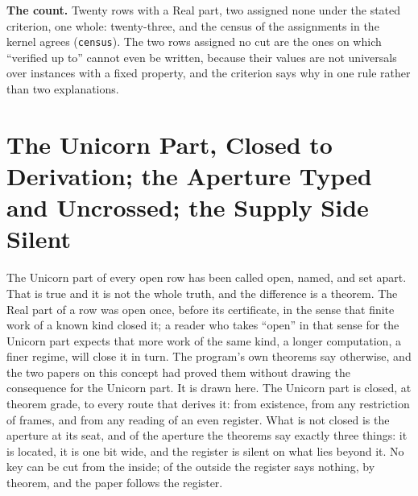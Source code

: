 \documentclass[10pt,twocolumn]{article}
\begin{document}
\textbf{The count.} Twenty rows with a Real part, two assigned none
under the stated criterion, one whole: twenty-three, and the census of
the assignments in the kernel agrees (\texttt{census}). The two rows
assigned no cut are the ones on which ``verified up to'' cannot even be
written, because their values are not universals over instances with a
fixed property, and the criterion says why in one rule rather than two
explanations.

\hypertarget{the-unicorn-part-closed-to-derivation-the-aperture-typed-and-uncrossed-the-supply-side-silent}{%
\section{The Unicorn Part, Closed to Derivation; the Aperture Typed and
Uncrossed; the Supply Side
Silent}\label{the-unicorn-part-closed-to-derivation-the-aperture-typed-and-uncrossed-the-supply-side-silent}}

The Unicorn part of every open row has been called open, named, and set
apart. That is true and it is not the whole truth, and the difference is
a theorem. The Real part of a row was open once, before its certificate,
in the sense that finite work of a known kind closed it; a reader who
takes ``open'' in that sense for the Unicorn part expects that more work
of the same kind, a longer computation, a finer regime, will close it in
turn. The program's own theorems say otherwise, and the two papers on
this concept had proved them without drawing the consequence for the
Unicorn part. It is drawn here. The Unicorn part is closed, at theorem
grade, to every route that derives it: from existence, from any
restriction of frames, and from any reading of an even register. What is
not closed is the aperture at its seat, and of the aperture the theorems
say exactly three things: it is located, it is one bit wide, and the
register is silent on what lies beyond it. No key can be cut from the
inside; of the outside the register says nothing, by theorem, and the
paper follows the register.
\end{document}

